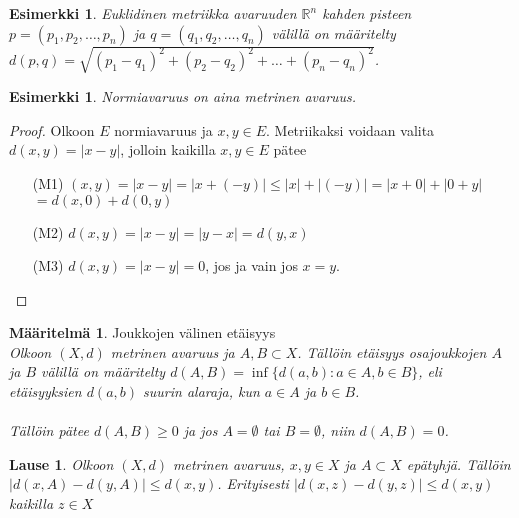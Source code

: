 \documentclass[12pt,a4paper,leqno]{report}
\newcommand{\R}{\mathbb{R}}
\theoremstyle{plain}
\newtheorem{lause}[equation]{Lause}
\theoremstyle{definition}
\newtheorem{maar}[equation]{Määritelmä}
\newtheorem{esim}[equation]{Esimerkki}
\theoremstyle{remark}
\begin{document}
\begin{esim}\emph{
Euklidinen metriikka avaruuden $\R^n$ kahden pisteen $p=(p_1,p_2,\dots,p_n)$ ja $q=(q_1,q_2,\dots,q_n)$ välillä on määritelty $d(p,q)=\sqrt{(p_1-q_1)^2+(p_2-q_2)^2+\dots+(p_n-q_n)^2}$.}
\end{esim}

\begin{esim}\emph{
Normiavaruus on aina metrinen avaruus. 
}
\begin{proof}
Olkoon $E$ normiavaruus ja $x,y\in E$. 
Metriikaksi voidaan valita $d(x,y)=|x-y|$, jolloin kaikilla $x,y\in E$ pätee
\begin{itemize}
\item[(M1)]%
$(x,y)=|x-y|=|x+(-y)|\leq|x|+|(-y)|=|x+0|+|0+y|$\\
$= d(x,0)+d(0,y)$
\item[(M2)]$d(x,y)=|x-y|=|y-x|=d(y,x)$
\item[(M3)]$d(x,y)=|x-y|=0$, jos ja vain jos $x=y$.
\end{itemize}
\end{proof}

\end{esim}
\begin{maar}Joukkojen välinen etäisyys\\
\emph{Olkoon $(X,d)$ metrinen avaruus ja $A,B\subset X$. Tällöin etäisyys osajoukkojen $A$ ja $B$ välillä on määritelty $d(A,B)=\inf\{d(a,b)\colon a\in A, b\in B\}$, eli etäisyyksien $d(a,b)$ suurin alaraja, kun $a\in A$ ja $b\in B$. }\\
\\
\emph{Tällöin pätee $d(A,B)\geq 0$ ja jos $A= \emptyset$ tai $B= \emptyset$, niin $d(A,B)= 0$. 
}
\end{maar}
\begin{lause}
\emph{Olkoon $(X,d)$ metrinen avaruus, $x,y\in X$ ja $A\subset X$ epätyhjä. Tällöin $|d(x,A)-d(y,A)|\leq d(x,y)$. Erityisesti $|d(x,z)-d(y,z)|\leq d(x,y)$ kaikilla $z\in X$}
\end{lause}
\end{document}
